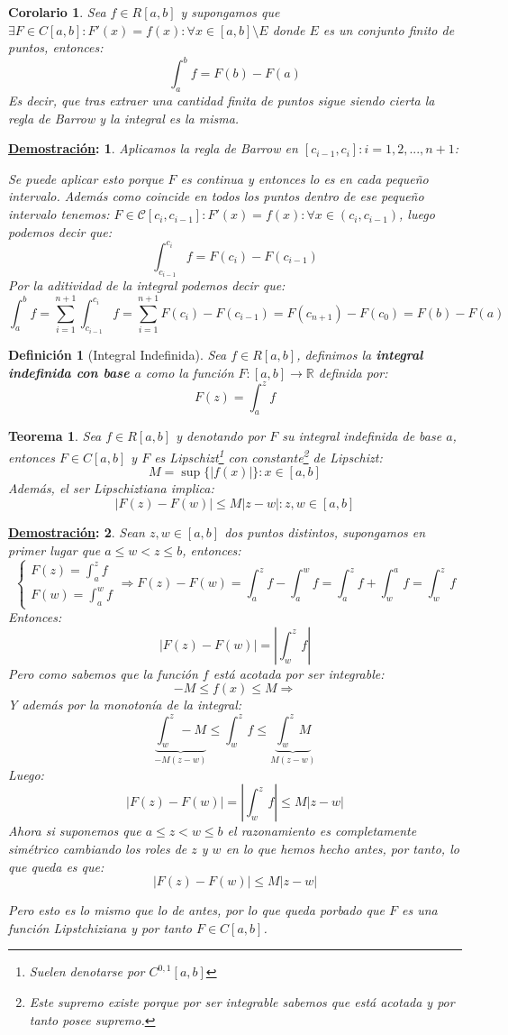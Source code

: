 \documentclass[10pt,a4paper,openright]{book}
\theoremstyle{break}
\newtheorem*{defi}{Definición}
\newtheorem*{theo}{Teorema}
\newtheorem*{coro}{Corolario}
\newtheorem*{demo}{\underline{Demostración}:}
\begin{document}
\begin{coro}
Sea $f\in R[a,b]$ y supongamos que $\exists F\in C[a,b]: F'(x) = f(x):\forall x\in [a,b]\setminus E$ donde $E$ es un conjunto finito de puntos, entonces:
$$\int_{a}^{b}f= F(b)- F(a)$$
Es decir, que tras extraer una cantidad finita de puntos sigue siendo cierta la regla de Barrow y la integral es la misma.
\end{coro}
\begin{demo}
Aplicamos la regla de Barrow en $[c_{i-1},c_{i}]: i = 1,2,..., n+1$:

Se puede aplicar esto porque $F$ es continua  y entonces lo es en cada pequeño intervalo. Además como coincide en todos los puntos dentro de ese pequeño intervalo tenemos: $F \in \mathcal{C}[c_i , c_{i-1}]:  F'(x)=f(x): \forall x \in (c_i , c_{i-1})$, luego podemos decir que:
$$\int_{c_{i-1}}^{c_i} f = F(c_i) - F(c_{i-1})$$
Por la aditividad de la integral podemos decir que:
$$\int_{a}^{b} f = \sum_{i=1}^{n+1} \int_{c_{i-1}}^{c_i} f = \sum_{i=1}^{n+1} F(c_i) - F(c_{i-1})= F(c_{n+1}) - F(c_0)  = F(b) - F(a)$$
\end{demo}

\begin{defi}[Integral Indefinida]
Sea $f\in R[a,b]$, definimos la \textbf{integral indefinida con base $a$} como la función $F:[a,b]\rightarrow \mathbb R$ definida por:
$$F(z)=\int_{a}^{z} f$$
\end{defi}

\begin{theo}
Sea $f\in R[a,b]$ y denotando por $F$ su integral indefinida de base $a$, entonces $F\in C[a,b]$ y $F$ es Lipschizt\footnote{Suelen denotarse por $C^{0,1}[a,b]$} con constante\footnote{Este supremo existe porque por ser integrable sabemos que está acotada y por tanto posee supremo.} de Lipschizt:
$$M=  \sup\{|f(x)|\}: x\in [a,b]$$
Además, el ser Lipschiztiana implica:
$$|F(z)-F(w)|\leq M |z-w|: z,w\in [a,b]$$
\end{theo}
\begin{demo}
Sean $z,w\in [a,b]$ dos puntos distintos, supongamos en primer lugar que $a\leq w<z\leq b$, entonces:
$$\begin{cases} F(z)= \int_{a}^{z} f \\ F(w) = \int_{a}^{w} f \end{cases}\Rightarrow F(z)-F(w) = \int_{a}^{z} f -\int_{a}^{w} f = \int_{a}^{z} f +\int_{w}^{a} f = \int_{w}^{z} f$$
Entonces:
$$|F(z)-F(w)| = \left|\int_{w}^{z} f \right|$$
Pero como sabemos que la función $f$ está acotada por ser integrable:
$$-M \leq f(x) \leq M \Rightarrow$$
Y además por la monotonía de la integral:
$$\underbrace{\int_{w}^{z} -M}_{-M(z-w)} \leq \int_{w}^{z} f\leq \underbrace{\int_{w}^{z} M}_{M(z-w)}$$
Luego:
$$|F(z)-F(w)| = \left|\int_{w}^{z} f \right| \leq M|z-w| $$
Ahora si suponemos que $a\leq z<w\leq b$ el razonamiento es completamente simétrico cambiando los roles de $z$ y $w$ en lo que hemos hecho antes, por tanto, lo que queda es que:
$$|F(z)-F(w)| \leq M|z-w| $$

Pero esto es lo mismo que lo de antes, por lo que queda porbado que $F$ es una función Lipstchiziana y por tanto $F\in C[a,b]$.
\end{demo}
\end{document}
